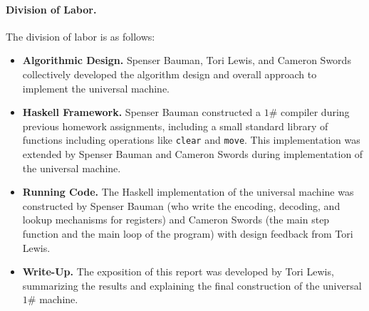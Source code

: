 \documentclass[10pt, preprint, nocopyrightspace]{sigplanconf}
\newcommand{\oh}{$1\#$\xspace}
\begin{document}
\paragraph{Division of Labor.} The division of labor is as follows:
\begin{itemize}
\item \textbf{Algorithmic Design.} 
      Spenser Bauman, Tori Lewis, and Cameron Swords collectively developed the
      algorithm design and overall approach to implement the universal machine.
\item \textbf{Haskell Framework.}
      Spenser Bauman constructed a \oh compiler during previous homework
      assignments, including a small standard library of functions including
      operations like \lstinline{clear} and \lstinline{move}. This
      implementation was extended by Spenser Bauman and Cameron Swords during
      implementation of the universal machine.
\item \textbf{Running Code.} 
      The Haskell implementation of the universal machine was constructed by
      Spenser Bauman (who write the encoding, decoding, and lookup mechanisms
      for registers) and Cameron Swords (the main step function and the main
      loop of the program) with design feedback from Tori Lewis.
\item \textbf{Write-Up.}
      The exposition of this report was developed by Tori Lewis, summarizing the
      results and explaining the final construction of the universal \oh
      machine. 
\end{itemize}
\end{document}
